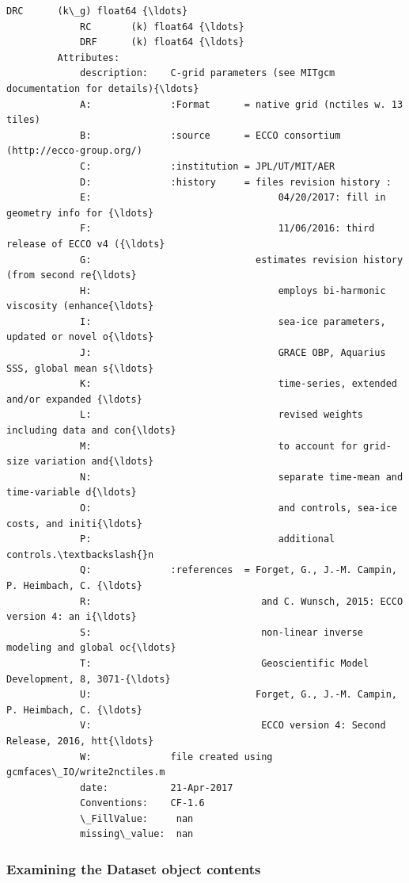 \documentclass[11pt]{article}
\begin{document}
\begin{Verbatim}[commandchars=\\\{\}]
             DRC      (k\_g) float64 {\ldots}
             RC       (k) float64 {\ldots}
             DRF      (k) float64 {\ldots}
         Attributes:
             description:    C-grid parameters (see MITgcm documentation for details){\ldots}
             A:              :Format      = native grid (nctiles w. 13 tiles)
             B:              :source      = ECCO consortium (http://ecco-group.org/)
             C:              :institution = JPL/UT/MIT/AER
             D:              :history     = files revision history :
             E:                                 04/20/2017: fill in geometry info for {\ldots}
             F:                                 11/06/2016: third release of ECCO v4 ({\ldots}
             G:                             estimates revision history (from second re{\ldots}
             H:                                 employs bi-harmonic viscosity (enhance{\ldots}
             I:                                 sea-ice parameters, updated or novel o{\ldots}
             J:                                 GRACE OBP, Aquarius SSS, global mean s{\ldots}
             K:                                 time-series, extended and/or expanded {\ldots}
             L:                                 revised weights including data and con{\ldots}
             M:                                 to account for grid-size variation and{\ldots}
             N:                                 separate time-mean and time-variable d{\ldots}
             O:                                 and controls, sea-ice costs, and initi{\ldots}
             P:                                 additional controls.\textbackslash{}n 
             Q:              :references  = Forget, G., J.-M. Campin, P. Heimbach, C. {\ldots}
             R:                              and C. Wunsch, 2015: ECCO version 4: an i{\ldots}
             S:                              non-linear inverse modeling and global oc{\ldots}
             T:                              Geoscientific Model Development, 8, 3071-{\ldots}
             U:                             Forget, G., J.-M. Campin, P. Heimbach, C. {\ldots}
             V:                              ECCO version 4: Second Release, 2016, htt{\ldots}
             W:              file created using gcmfaces\_IO/write2nctiles.m
             date:           21-Apr-2017
             Conventions:    CF-1.6
             \_FillValue:     nan
             missing\_value:  nan
\end{Verbatim}
            
    \subsubsection{Examining the Dataset object
contents}\label{examining-the-dataset-object-contents}
\end{document}
